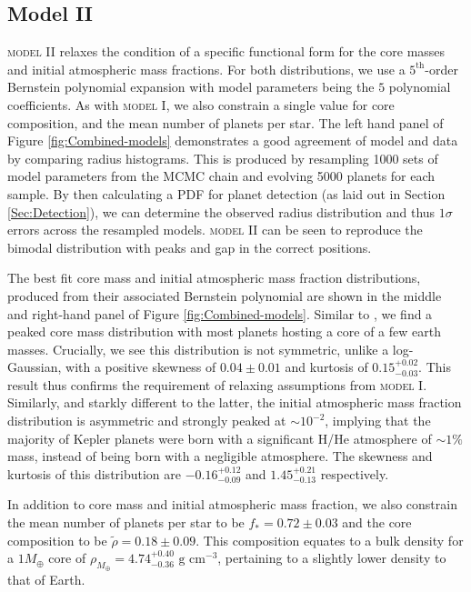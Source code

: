 \documentclass[fleqn,usenatbib]{mnras}
\begin{document}
\subsection{Model II} \label{sec:ModelII}


\textsc{model II} relaxes the condition of a specific functional form for the core masses and initial atmospheric mass fractions. For both distributions, we use a $5^\text{th}$-order Bernstein polynomial expansion with model parameters being the $5$ polynomial coefficients. As with \textsc{model I}, we also constrain a single value for core composition, and the mean number of planets per star. The left hand panel of Figure \ref{fig:Combined-models} demonstrates a good agreement of model and data by comparing radius histograms. This is produced by resampling 1000 sets of model parameters from the MCMC chain and evolving 5000 planets for each sample. By then calculating a PDF for planet detection (as laid out in Section \ref{Sec:Detection}), we can determine the observed radius distribution and thus $1\sigma$ errors across the resampled models. \textsc{model II} can be seen to reproduce the bimodal distribution with peaks and gap in the correct positions. 

The best fit core mass and initial atmospheric mass fraction distributions, produced from their associated Bernstein polynomial are shown in the middle and right-hand panel of Figure \ref{fig:Combined-models}. Similar to \cite{Wu2019}, we find a peaked core mass distribution with most planets hosting a core of a few earth masses. Crucially, we see this distribution is not symmetric, unlike a log-Gaussian, with a positive skewness of $0.04\pm0.01$ and kurtosis of $0.15^{+0.02}_{-0.03}$. This result thus confirms the requirement of relaxing assumptions from \textsc{model I}. Similarly, and starkly different to the latter, the initial atmospheric mass fraction distribution is asymmetric and strongly peaked at $\sim 10^{-2}$, implying that the majority of Kepler planets were born with a significant H/He atmosphere of $\sim 1\%$ mass, instead of being born with a negligible atmosphere. The skewness and kurtosis of this distribution are $-0.16^{+0.12}_{-0.09}$ and $1.45^{+0.21}_{-0.13}$ respectively.


In addition to core mass and initial atmospheric mass fraction, we also constrain the mean number of planets per star to be $f_* = 0.72\pm0.03$ and the core composition to be $\tilde{\rho} = 0.18\pm0.09$. This composition equates to a bulk density for a $1M_\oplus$ core of $\rho_{M_\oplus} = 4.74^{+0.40}_{-0.36} \text{ g cm}^{-3}$, pertaining to a slightly lower density to that of Earth.
\end{document}
